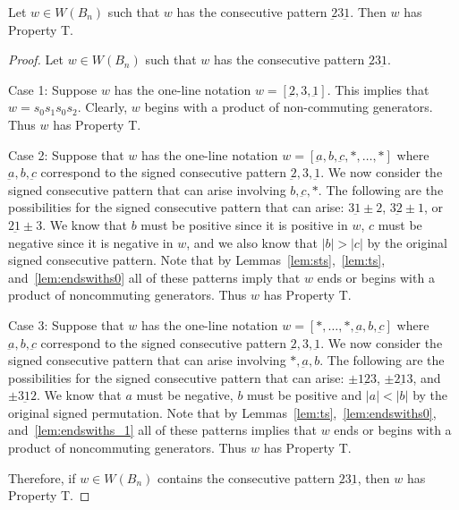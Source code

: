 \begin{lemma}\label{lem:2312}
Let $w \in W(B_n)$ such that $w$ has the consecutive pattern $\underbar{2}3\underbar{1}$. Then $w$ has Property T.
\begin{proof}
	Let $w \in W(B_n)$ such that $w$ has the consecutive pattern $\underbar{2}3\underbar{1}$.
	
	Case 1: Suppose $w$ has the one-line notation $w=[\underbar{2},3,\underbar{1}]$. This implies that $w=s_0s_1s_0s_2$. Clearly, $w$ begins with a product of non-commuting generators. Thus $w$ has Property T.
	
	Case 2: Suppose that $w$ has the one-line notation $w=[\underbar{a},b,\underbar{c}, \ast, \ldots, \ast]$ where $\underbar{a},b,\underbar{c}$ correspond to the signed consecutive pattern $\underbar{2},3,\underbar{1}$. We now consider the signed consecutive pattern that can arise involving $b,\underbar{c}, \ast$. The following are the possibilities for the signed consecutive pattern that can arise: $3\underbar{1}\pm2$, $3\underbar{2} \pm1$, or $2\underbar{1}\pm3$. We know that $b$ must be positive since it is positive in $w$, $c$ must be negative since it is negative in $w$, and we also know that $|b|>|c|$ by the original signed consecutive pattern. Note that by Lemmas~\ref{lem:sts},~\ref{lem:ts}, and~\ref{lem:endswiths0} all of these patterns imply that $w$ ends or begins with a product of noncommuting generators. Thus $w$ has Property T.
	
	Case 3: Suppose that $w$ has the one-line notation $w=[\ast, \ldots, \ast, \underbar{a},b,\underbar{c}]$ where $\underbar{a},b,\underbar{c}$ correspond to the signed consecutive pattern $\underbar{2},3,\underbar{1}$. We now consider the signed consecutive pattern that can arise involving $\ast, \underbar{a}, b$. The following are the possibilities for the signed consecutive pattern that can arise: $\pm1 \underbar{2} 3$, $\pm 2 \underbar{1} 3$, and $\pm 3 \underbar{1} 2$. We know that $a$ must be negative, $b$ must be positive and $|a|<|b|$ by the original signed permutation. Note that by Lemmas~\ref{lem:ts},~\ref{lem:endswiths0}, and~\ref{lem:endswiths_1} all of these patterns implies that $w$ ends or begins with a product of noncommuting generators. Thus $w$ has Property T. 

	Therefore, if $w \in W(B_n)$ contains the consecutive pattern $\underbar{2}3\underbar{1}$, then $w$ has Property T.
\end{proof}	
\end{lemma}

